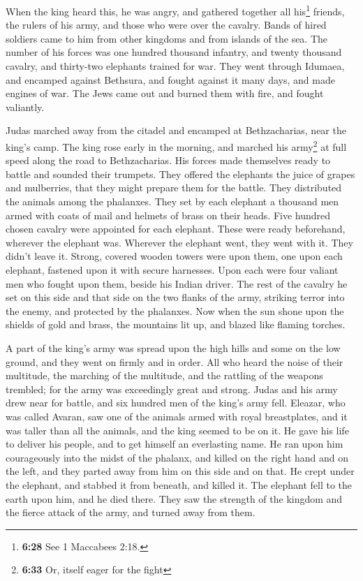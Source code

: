  When the king heard this, he was angry, and gathered
together all his\footnote{\textbf{6:28} See 1 Maccabees 2:18.} friends,
the rulers of his army, and those who were over the cavalry.
 Bands of hired soldiers came to him from other kingdoms
and from islands of the sea.  The number of his forces
was one hundred thousand infantry, and twenty thousand cavalry, and
thirty-two elephants trained for war.  They went through
Idumaea, and encamped against Bethsura, and fought against it many days,
and made engines of war. The Jews came out and burned them with fire,
and fought valiantly.

 Judas marched away from the citadel and encamped at
Bethzacharias, near the king's camp.  The king rose early
in the morning, and marched his army\footnote{\textbf{6:33} Or, itself
  eager for the fight} at full speed along the road to Bethzacharias.
His forces made themselves ready to battle and sounded their trumpets.
 They offered the elephants the juice of grapes and
mulberries, that they might prepare them for the battle. 
They distributed the animals among the phalanxes. They set by each
elephant a thousand men armed with coats of mail and helmets of brass on
their heads. Five hundred chosen cavalry were appointed for each
elephant.  These were ready beforehand, wherever the
elephant was. Wherever the elephant went, they went with it. They didn't
leave it.  Strong, covered wooden towers were upon them,
one upon each elephant, fastened upon it with secure harnesses. Upon
each were four valiant men who fought upon them, beside his Indian
driver.  The rest of the cavalry he set on this side and
that side on the two flanks of the army, striking terror into the enemy,
and protected by the phalanxes.  Now when the sun shone
upon the shields of gold and brass, the mountains lit up, and blazed
like flaming torches.

 A part of the king's army was spread upon the high hills
and some on the low ground, and they went on firmly and in order.
 All who heard the noise of their multitude, the marching
of the multitude, and the rattling of the weapons trembled; for the army
was exceedingly great and strong.  Judas and his army
drew near for battle, and six hundred men of the king's army fell.
 Eleazar, who was called Avaran, saw one of the animals
armed with royal breastplates, and it was taller than all the animals,
and the king seemed to be on it.  He gave his life to
deliver his people, and to get himself an everlasting name.
 He ran upon him courageously into the midst of the
phalanx, and killed on the right hand and on the left, and they parted
away from him on this side and on that.  He crept under
the elephant, and stabbed it from beneath, and killed it. The elephant
fell to the earth upon him, and he died there.  They saw
the strength of the kingdom and the fierce attack of the army, and
turned away from them.


